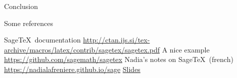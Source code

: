 \documentclass[10pts]{beamer}
\begin{document}
	\begin{frame}{Conclusion}
	
	{\Large Some references}
	\begin{thebibliography}{99}
		 Sage\TeX ~documentation \url{http://ctan.ijs.si/tex-archive/macros/latex/contrib/sagetex/sagetex.pdf}
		 A nice example\\ \url{https://github.com/sagemath/sagetex}
		 Nadia's notes on Sage\TeX ~(french) \url{https://nadialafreniere.github.io/sage}
		 \href{https://phubert.github.io/sage.html}{Slides}
	\end{thebibliography}
	\end{frame}
\end{document}
